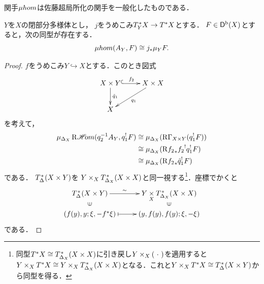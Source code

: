 関手\(\muhom\)は佐藤超局所化の関手を一般化したものである．

\begin{leftbar}
\begin{PRP}
  \(Y\)を\(X\)の閉部分多様体とし，
  \(j\)をうめこみ\(\conm[Y]{X}\to \cotb[X]\)とする．
  \(F\in\Dompb(X)\)とすると，次の同型が存在する．
  \[
    \muhom(A_Y,F)\cong j_{\ast}\mu_{Y}F.
  \]
\end{PRP}
\end{leftbar}
\begin{proof}
  \(f\)をうめこみ\(Y\hookrightarrow X\)とする．このとき図式\[
  \vcenter{\xymatrix{
      X\times Y
      \ar@{^{(}->}[r]^-{f_2}
      \ar[d]^-{\tilde{q}_1}
      &
      X\times X
      \ar[ld]^-{q_1}
      \\
      X
  }}\]を考えて，
  \begin{align*}
    \mu_{\diag[X]}\RHOM(q_2^{-1}A_{Y},q_1^!F)
    &\cong
    \mu_{\diag[X]}(\RG_{X\times Y}(q_1^!F))\\
    &\cong
    \mu_{\diag[X]}(\Rder{{f_2}_{\ast}}{f_2}^{!}q_1^!F)\\
    &\cong
    \mu_{\diag[X]}(\Rder{{f_2}_{\ast}}\tilde{q}_{1}^{!}F)
  \end{align*}
  である．
  \(\conm[{\diag[]}]{(X\times Y)}\)を
  \(
    Y\tpb[X]\conm[{\diag[X]}]{(X\times X)}
  \)と同一視する\footnote{
    同型\(\cotb[X]\cong\conm[{\diag[X]}]{(X\times X)}\)に引き戻し\(Y\tpb[X](\blk)\)を適用すると
    \(
      Y\tpb[X]\cotb[X]
      \cong 
      Y\tpb[X]\conm[{\diag[X]}]{(X\times X)}
    \)となる．これと\(
      Y\tpb[X]\cotb[X]
      \cong 
      \conm[{\diag[]}]{(X\times Y)}
    \)から同型を得る．
  }．座標でかくと\[    
    \vcenter{\xymatrix@C=26pt@R=10pt{
      \conm[{\diag[]}]{(X\times Y)}
      \ar[r]^-{\sim}
      &
      Y\dpb[X]\conm[{\diag[X]}]{(X\times X)}
      \\
      \left(f(y),y;\xi,-f^{\ast}\xi\right)
      \ar@{}[u]|{\rotatebox{90}{\(\in\)}}
      \ar@{{|}->}[r]_-{}
      &
      \ar@{}[u]|{\rotatebox{90}{\(\in\)}}
      \left(y,f(y),f(y);\xi,-\xi\right)
    }}
  \]である．


\end{proof}
